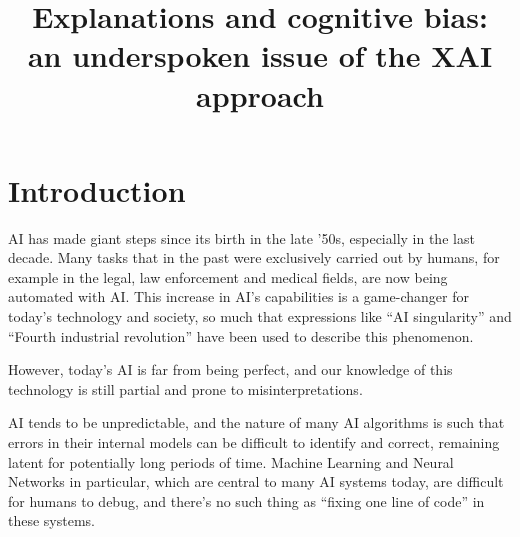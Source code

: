 \documentclass[conference]{IEEEtran}
\newcommand{\cit}[1][]{\todo[tickmarkheight=0.2cm]{cit #1}}
\begin{document}
\title{Explanations and cognitive bias:\\an underspoken issue of the XAI approach}


\author{
    }

\maketitle

\begin{abstract}
\end{abstract}

\section{Introduction}
\label{sec:intro}

AI has made giant steps since its birth in the late '50s, especially in the last decade.
Many tasks that in the past were exclusively carried out by humans, for example
in the legal, law enforcement and medical fields, are now being automated with AI. This increase in AI's capabilities is a game-changer for today's technology and society, so much that expressions like ``AI singularity'' \cit and ``Fourth industrial revolution'' \cit have been used to describe this phenomenon.




However, today's AI is far from being perfect, and our knowledge of this
technology is still partial and prone to misinterpretations.

AI tends to be unpredictable, and the nature of many AI
algorithms is such that errors in their internal models can be difficult to
identify and correct, remaining latent for potentially long periods of time. Machine Learning and Neural Networks in particular, which are central to many AI systems today, are difficult for humans to debug, and there's no such thing as ``fixing one line of code'' in these systems.
\end{document}
